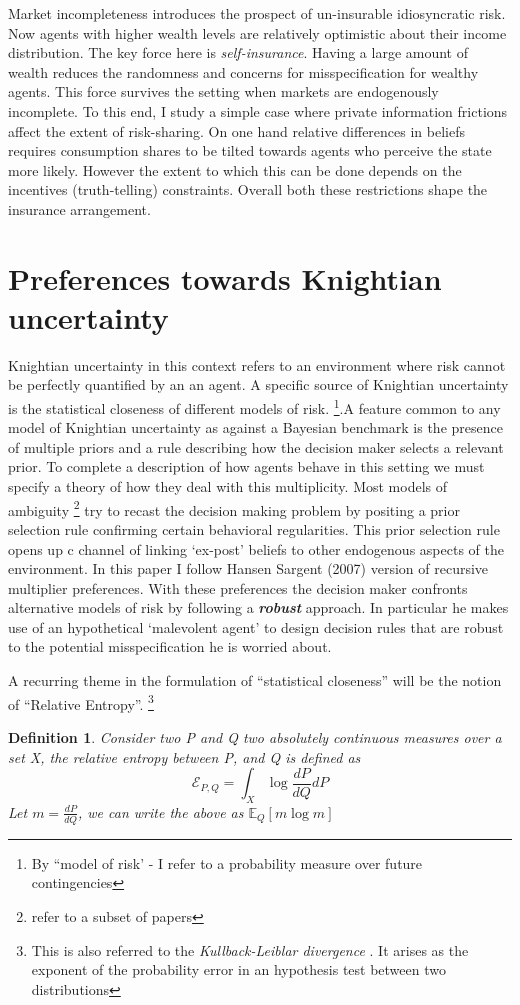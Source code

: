 \documentclass[12pt]{article}
\newtheorem{definition}{Definition}
\begin{document}
Market incompleteness introduces the prospect of un-insurable idiosyncratic risk. Now agents with higher wealth levels are relatively optimistic about their income distribution. The key force here is \emph{self-insurance}. Having a large amount of wealth reduces the randomness and concerns for misspecification for wealthy agents. This force survives the setting when markets are endogenously incomplete. To this end, I study a simple case where private information frictions affect the extent of risk-sharing. On one hand relative differences in beliefs requires consumption shares to be tilted towards agents who perceive the state more likely. However the extent to which this can be done depends on the incentives (truth-telling) constraints. Overall both these restrictions shape the insurance arrangement.

\section{Preferences towards Knightian uncertainty}
\noindent Knightian uncertainty in this context refers to an environment where risk cannot be perfectly quantified by an an agent. A specific source of Knightian uncertainty is the statistical closeness of different models of risk. \footnote{By ``model of risk' - I refer to a probability measure over future contingencies}.A feature common to any model of Knightian uncertainty as against a Bayesian benchmark is the presence of multiple priors and a rule describing how the decision maker selects a relevant prior. To complete a description of how agents behave in this setting we must specify a theory of how they deal with this multiplicity. Most models of ambiguity \footnote{refer to a subset of papers } try to recast the decision making problem by positing a prior selection rule confirming certain behavioral regularities. This prior selection rule opens up c channel of linking `ex-post' beliefs to other endogenous aspects of the environment. In this paper I follow Hansen Sargent (2007) version of recursive 
multiplier preferences. With these preferences the decision maker confronts alternative models of risk by following a \textbf{\emph{robust}} approach. In particular he makes use of an hypothetical `malevolent agent' to design decision rules that are robust to the potential misspecification he is worried about. 

\noindent A recurring theme in the formulation of ``statistical closeness'' will be the notion of ``Relative Entropy''. \footnote{This is also referred to the \emph{Kullback-Leiblar divergence} . It arises as the exponent of the probability error in an hypothesis test between two distributions}
\begin{definition}
Consider two P and Q two absolutely continuous measures over a set X, the relative entropy between P, and Q is defined as 
\[\mathcal{E}_{P,Q} = \int_{X}\log\frac{{dP}}{dQ}dP\]
Let $m=\frac{{dP}}{dQ}$, we can write the above as $\mathbb{E}_Q [m \log m]$
\end{definition}
\end{document}
